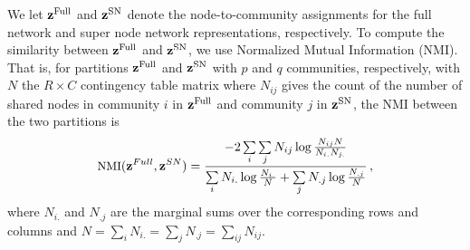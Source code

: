 We let ${\bf z}^{\text{Full}}$ and ${\bf z}^{\text{SN}}$ denote the node-to-community assignments for the full network and super node network representations, respectively. To compute the similarity between ${\bf z}^{\text{Full}}$ and ${\bf z}^{\text{SN}}$, we use Normalized Mutual Information (NMI).\cite{danon} That is, for partitions ${\bf z}^{\text{Full}}$ and ${\bf z}^{\text{SN}}$ with $p$ and $q$ communities, respectively, with $N$ the $R \times C$ contingency table matrix where $N_{ij}$ gives the count of the number of shared nodes in community $i$ in  ${\bf z}^{\text{Full}}$ and community $j$ in ${\bf z}^{\text{SN}}$, the NMI between the two partitions is 
\begin{equation}
\label{NMI}
\small{\text{NMI}({\bf{z}}^{Full},{\bf{z}}^{SN})=\frac{-2\sum\limits_{i}\sum\limits_{j}N_{ij}\log \frac{N_{ij}N}{N_{i.}N_{j.}}}{\sum\limits_{i}N_{i.}\log\frac{N_{i.}}{N}+\sum\limits_{j}N_{.j}\log\frac{N_{.j}}{N}}}\,,
\end{equation}
where $N_{i.}$ and $N_{.j}$ are the marginal sums over the corresponding rows and columns and $N=\sum_i N_{i.}=\sum_j N_{.j}=\sum_{ij} N_{ij}$. 

